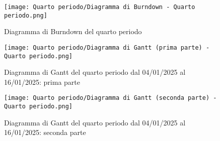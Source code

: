 \newpage
\begin{figure}[h] 
    \centering
    \texttt{[image: Quarto periodo/Diagramma di Burndown - Quarto periodo.png]}
    \caption{Diagramma di Burndown del quarto periodo} 
    \label{fig: Diagramma di Burndown del quarto periodo}
\end{figure}

\newpage
\begin{figure}[h] 
    \centering
    \texttt{[image: Quarto periodo/Diagramma di Gantt (prima parte) - Quarto periodo.png]}
    \caption{Diagramma di Gantt del quarto periodo dal 04/01/2025 al 16/01/2025: prima parte} 
    \label{fig: Diagramma di Gantt quarto periodo dal 04/01/2025 al 16/01/2025: prima parte}
\end{figure}

\newpage
\begin{figure}[h] 
    \centering
    \texttt{[image: Quarto periodo/Diagramma di Gantt (seconda parte) - Quarto periodo.png]}
    \caption{Diagramma di Gantt del quarto periodo dal 04/01/2025 al 16/01/2025: seconda parte} 
    \label{fig: Diagramma di Gantt quarto periodo dal 04/01/2025 al 16/01/2025 : seconda parte}
\end{figure}
\newpage

